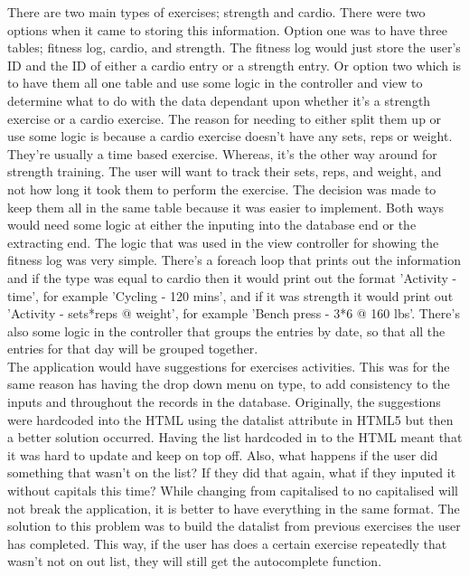 There are two main types of exercises; strength and cardio. There were two options when it came to storing this information. Option one was to have three tables; fitness log, cardio, and strength. The fitness log would just store the user's ID and the ID of either a cardio entry or a strength entry. Or option two which is to have them all one table and use some logic in the controller and view to determine what to do with the data dependant upon whether it's a strength exercise or a cardio exercise. The reason for needing to either split them up or use some logic is because a cardio exercise doesn't have any sets, reps or weight. They're usually a time based exercise. Whereas, it's the other way around for strength training. The user will want to track their sets, reps, and weight, and not how long it took them to perform the exercise. The decision was made to keep them all in the same table because it was easier to implement. Both ways would need some logic at either the inputing into the database end or the extracting end. The logic that was used in the view controller for showing the fitness log was very simple. There's a foreach loop that prints out the information and if the type was equal to cardio then it would print out the format 'Activity - time', for example 'Cycling - 120 mins', and if it was strength it would print out 'Activity - sets*reps @ weight', for example 'Bench press - 3*6 @ 160 lbs'. There's also some logic in the controller that groups the entries by date, so that all the entries for that day will be grouped together.\\

The application would have suggestions for exercises activities. This was for the same reason has having the drop down menu on type, to add consistency to the inputs and throughout the records in the database. Originally, the suggestions were hardcoded into the HTML using the datalist attribute in HTML5 but then a better solution occurred. Having the list hardcoded in to the HTML meant that it was hard to update and keep on top off. Also, what happens if the user did something that wasn't on the list? If they did that again, what if they inputed it without capitals this time? While changing from capitalised to no capitalised will not break the application, it is better to have everything in the same format. The solution to this problem was to build the datalist from previous exercises the user has completed. This way, if the user has does a certain exercise repeatedly that wasn't not on out list, they will still get the autocomplete function.\\

